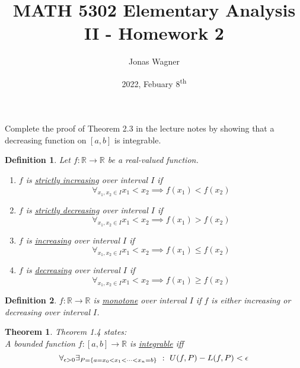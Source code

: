 \documentclass[]{article}
\title{MATH 5302 Elementary Analysis II - Homework 2}
\author{Jonas Wagner}
\date{2022, Febuary 8\textsuperscript{th}}
\newcommand{\R}{\mathbb{R}}
\newcommand{\st}{\ : \ }
\newtheorem{definition}{Definition}
\newtheorem{theorem}{Theorem}
\begin{document}
\maketitle

\section{}
Complete the proof of Theorem 2.3 in the lecture notes by showing that a decreasing function on $[a,b]$ is integrable.

\begin{definition}\label{def:increasingAndDecreasing}
    Let $f : \R \to \R$ be a real-valued function.
    \begin{enumerate}
        \item $f$ is \underline{\emph{strictly increasing}} over interval $I$ if\[
            \forall_{x_1, x_2\in I} x_1 < x_2 \implies f(x_1) < f(x_2)  
            \]
        \item $f$ is \underline{\emph{strictly decreasing}} over interval $I$ if\[
            \forall_{x_1, x_2\in I} x_1 < x_2 \implies f(x_1) > f(x_2)  
            \]
        \item $f$ is \underline{\emph{increasing}} over interval $I$ if\[
            \forall_{x_1, x_2\in I} x_1 < x_2 \implies f(x_1) \leq f(x_2)  
            \]
        \item $f$ is \underline{\emph{decreasing}} over interval $I$ if\[
            \forall_{x_1, x_2\in I} x_1 < x_2 \implies f(x_1) \geq f(x_2)  
            \]
    \end{enumerate}
\end{definition}

\begin{definition}
    $f : \R \to \R$ is \underline{\emph{monotone}} over interval $I$ if $f$ is either increasing or decreasing over interval $I$.
\end{definition}

\begin{theorem}
    Theorem 1.4 states:\\
    A bounded function $f : [a,b] \to \R$ is \underline{\emph{integrable}} iff \[
        \forall_{\epsilon>0} 
        \exists_{P = \qty{a=x_0<x_1<\dots<x_n=b}} 
        \st U(f,P) - L(f,P) < \epsilon
    \]
\end{theorem}
\end{document}
